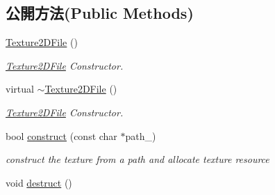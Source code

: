 \subsection*{公開方法(Public Methods)}
\begin{DoxyCompactItemize}
\item 
\hyperlink{class_magnum_1_1_texture2_d_file_ad7997bc2c58393ffbb0f5e817e3c0d9c}{Texture2\+D\+File} ()
\begin{DoxyCompactList}\small\item\em \hyperlink{class_magnum_1_1_texture2_d_file}{Texture2\+D\+File} Constructor. \end{DoxyCompactList}\item 
virtual \hyperlink{class_magnum_1_1_texture2_d_file_a8146587656686cd41b23a3ee036239d6}{$\sim$\+Texture2\+D\+File} ()
\begin{DoxyCompactList}\small\item\em \hyperlink{class_magnum_1_1_texture2_d_file}{Texture2\+D\+File} Constructor. \end{DoxyCompactList}\item 
bool \hyperlink{class_magnum_1_1_texture2_d_file_a8799d191824e368b8bf6a1eeec3ea578}{construct} (const char $\ast$path\+\_\+)
\begin{DoxyCompactList}\small\item\em construct the texture from a path and allocate texture resource \end{DoxyCompactList}\item 
void \hyperlink{class_magnum_1_1_texture2_d_file_af4b329a7880543fb2802e44e7f1ba933}{destruct} ()\hypertarget{class_magnum_1_1_texture2_d_file_af4b329a7880543fb2802e44e7f1ba933}{}\label{class_magnum_1_1_texture2_d_file_af4b329a7880543fb2802e44e7f1ba933}


\end{DoxyCompactItemize}
